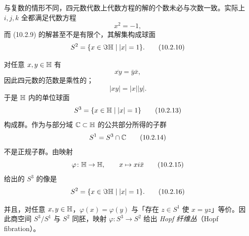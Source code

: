 与复数的情形不同，四元数代数上代数方程的解的个数未必与次数一致。实际上 $i,j,k$ 全都满足代数方程
\begin{equation}
  x^2=-1, \tag{10.2.9}
\end{equation}
而 (10.2.9) 的解甚至不是有限个，其解集构成球面
\begin{equation}
  S^2=\{x\in\Im\mathbb{H}\mid |x|=1\}. \tag{10.2.10}
\end{equation}

对任意 $x,y\in\mathbb{H}$ 有
\begin{equation}
  \overline{xy}=\bar y\bar x, \tag{10.2.11}
\end{equation}
因此四元数的范数是乘性的；
\begin{equation}
  |xy|=|x||y|. \tag{10.2.12}
\end{equation}
于是 $\mathbb{H}$ 内的单位球面
\begin{equation}
  S^3=\{x\in\mathbb{H}\mid |x|=1\} \tag{10.2.13}
\end{equation}
构成群。作为与部分域 $\mathbb{C}\subset\mathbb{H}$ 的公共部分所得的子群
\begin{equation}
  S^1=S^3\cap\mathbb{C} \tag{10.2.14}
\end{equation}
不是正规子群。由映射
\begin{equation}
  \varphi\colon\mathbb{H}\to\mathbb{H},\qquad x\mapsto xi\bar x \tag{10.2.15}
\end{equation}
给出的 $S^3$ 的像是
\begin{equation}
  S^2=\{x\in\Im\mathbb{H}\mid |x|=1\}. \tag{10.2.16}
\end{equation}

并且，对任意 $x,y\in\mathbb{H}$，$\varphi(x)=\varphi(y)$ 与「存在 $z\in S^1$ 使 $x=yz$」等价。因此商空间 $S^3/S^1$ 与 $S^2$ 同胚，映射 $\varphi\colon S^3\to S^2$ 给出 \emph{Hopf 纤维丛}（Hopf fibration）。


